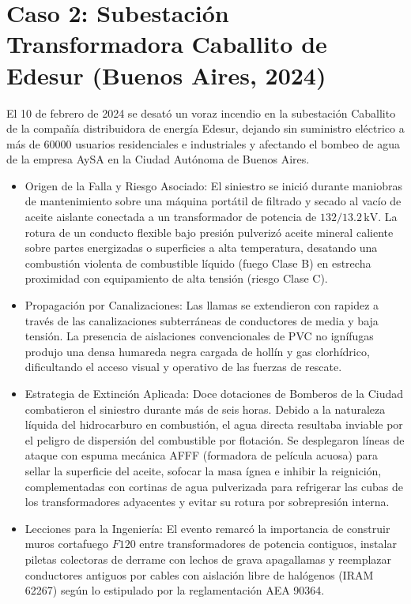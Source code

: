 \section{Caso 2: Subestación Transformadora Caballito de Edesur (Buenos Aires, 2024)}
\label{sec.cap8:edesur_caballito}

El 10 de febrero de 2024 se desató un voraz incendio en la subestación Caballito de la compañía distribuidora de energía
Edesur, dejando sin suministro eléctrico a más de $60000$ usuarios residenciales e industriales y afectando el bombeo de
agua de la empresa AySA en la Ciudad Autónoma de Buenos Aires.

\begin{itemize}
    \item Origen de la Falla y Riesgo Asociado: El siniestro se inició durante maniobras de mantenimiento sobre una
          máquina portátil de filtrado y secado al vacío de aceite aislante conectada a un transformador de potencia de
          $132/13.2\,\mathrm{kV}$. La rotura de un conducto flexible bajo presión pulverizó aceite mineral caliente sobre
          partes energizadas o superficies a alta temperatura, desatando una combustión violenta de combustible líquido
          (fuego Clase B) en estrecha proximidad con equipamiento de alta tensión (riesgo Clase C).
    \item Propagación por Canalizaciones: Las llamas se extendieron con rapidez a través de las canalizaciones subterráneas
          de conductores de media y baja tensión. La presencia de aislaciones convencionales de PVC no ignífugas produjo una
          densa humareda negra cargada de hollín y gas clorhídrico, dificultando el acceso visual y operativo de las
          fuerzas de rescate.
    \item Estrategia de Extinción Aplicada: Doce dotaciones de Bomberos de la Ciudad combatieron el siniestro durante más
          de seis horas. Debido a la naturaleza líquida del hidrocarburo en combustión, el agua directa resultaba inviable
          por el peligro de dispersión del combustible por flotación. Se desplegaron líneas de ataque con espuma mecánica
          AFFF (formadora de película acuosa) para sellar la superficie del aceite, sofocar la masa ígnea e inhibir la
          reignición, complementadas con cortinas de agua pulverizada para refrigerar las cubas de los transformadores
          adyacentes y evitar su rotura por sobrepresión interna.
    \item Lecciones para la Ingeniería: El evento remarcó la importancia de construir muros cortafuego $F120$ entre
          transformadores de potencia contiguos, instalar piletas colectoras de derrame con lechos de grava apagallamas y
          reemplazar conductores antiguos por cables con aislación libre de halógenos (IRAM 62267) según lo estipulado por
          la reglamentación AEA 90364.
\end{itemize}

